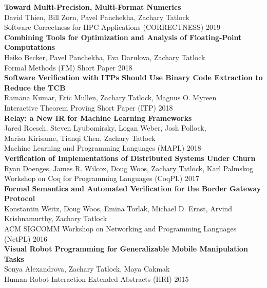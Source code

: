 \documentclass[10pt]{article}
\begin{document}
\textbf{%
Toward Multi-Precision, Multi-Format Numerics
} \\
David Thien, Bill Zorn, Pavel Panchekha, Zachary Tatlock \\
Software Correctness for HPC Applications (CORRECTNESS) 2019 \\

\textbf{%
Combining Tools for Optimization and Analysis of Floating-Point Computations
} \\
Heiko Becker, Pavel Panchekha, Eva Darulova, Zachary Tatlock \\
Formal Methods (FM) Short Paper 2018 \\

\textbf{%
Software Verification with ITPs Should Use Binary Code Extraction to Reduce the TCB
} \\
Ramana Kumar, Eric Mullen, Zachary Tatlock, Magnus O. Myreen \\
Interactive Theorem Proving Short Paper (ITP) 2018 \\

\textbf{%
Relay: a New IR for Machine Learning Frameworks
} \\
Jared Roesch, Steven Lyubomirsky, Logan Weber, Josh Pollock, \\
Marisa Kirisame, Tianqi Chen, Zachary Tatlock \\
Machine Learning and Programming Languages (MAPL) 2018 \\

\textbf{%
Verification of Implementations of Distributed Systems Under Churn
} \\
Ryan Doenges, James R. Wilcox, Doug Woos, Zachary Tatlock, Karl Palmskog \\
Workshop on Coq for Programming Languages (CoqPL) 2017 \\

\textbf{%
Formal Semantics and Automated Verification for the Border Gateway Protocol
} \\
Konstantin Weitz, Doug Woos, Emina Torlak, Michael D. Ernst, Arvind Krishnamurthy, Zachary Tatlock \\
ACM SIGCOMM Workshop on Networking and Programming Languages (NetPL) 2016 \\

\textbf{%
Visual Robot Programming for Generalizable Mobile Manipulation Tasks
} \\
Sonya Alexandrova, Zachary Tatlock, Maya Cakmak \\
Human Robot Interaction Extended Abstracts (HRI) 2015 \\
\end{document}
